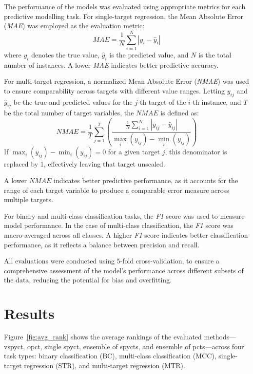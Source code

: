 \documentclass[3p,review,authoryear]{elsarticle}
\begin{document}
The performance of the models was evaluated using appropriate metrics for each predictive modelling task. For single-target regression, the Mean Absolute Error (\textit{MAE}) was employed as the evaluation metric:
\[
\textit{MAE} = \frac{1}{N} \sum_{i=1}^{N} \left| y_i - \hat{y}_i \right|
\]
where \( y_i \) denotes the true value, \(\hat{y}_i\) is the predicted value, and \(N\) is the total number of instances. A lower \textit{MAE} indicates better predictive accuracy.

For multi-target regression, a normalized Mean Absolute Error (\textit{NMAE}) was used to ensure comparability across targets with different value ranges. Letting \(y_{ij}\) and \(\hat{y}_{ij}\) be the true and predicted values for the \(j\)-th target of the \(i\)-th instance, and \(T\) be the total number of target variables, the \(\textit{NMAE}\) is defined as:
\[
\textit{NMAE} = \frac{1}{T} \sum_{j=1}^{T} \left( \frac{\frac{1}{N} \sum_{i=1}^{N} | y_{ij} - \hat{y}_{ij} |}{\max_i(y_{ij}) - \min_i(y_{ij})} \right)
\]
If \(\max_i(y_{ij}) - \min_i(y_{ij}) = 0\) for a given target \(j\), this denominator is replaced by 1, effectively leaving that target unscaled.

A lower \(\textit{NMAE}\) indicates better predictive performance, as it accounts for the range of each target variable to produce a comparable error measure across multiple targets.


For binary and multi-class classification tasks, the \textit{F1} score was used to measure model performance.
In the case of multi-class classification, the \textit{F1} score was macro-averaged across all classes.
A higher \textit{F1} score indicates better classification performance, as it reflects a balance between precision and recall.

All evaluations were conducted using 5-fold cross-validation, to ensure a comprehensive assessment of the model's performance across different subsets of the data, reducing the potential for bias and overfitting.


\section{Results}

Figure~\ref{fig:avg_rank} shows the average rankings of the evaluated methods—\gls{vspyct}, \gls{opct}, single \gls{spyct}, ensemble of \glspl{spyct}, and ensemble of \glspl{pct}—across four task types: binary classification (BC), multi-class classification (MCC), single-target regression (STR), and multi-target regression (MTR).
\end{document}
